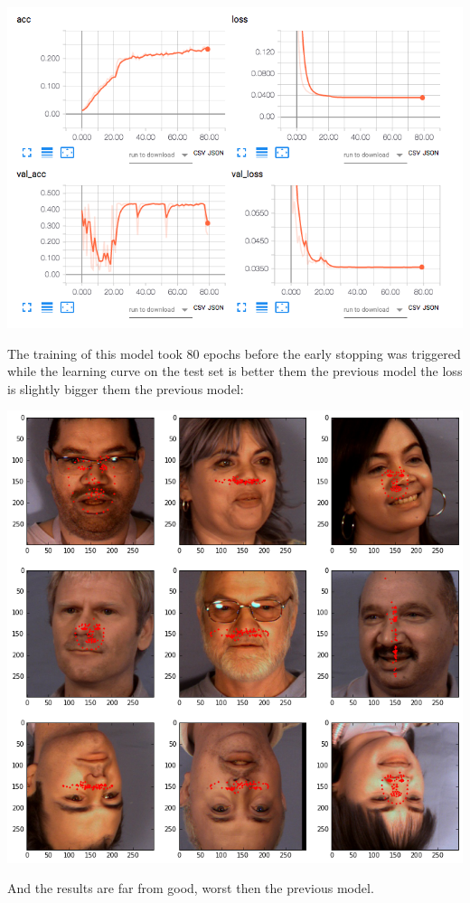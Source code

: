 \documentclass[11pt]{article}
\begin{document}
\begin{enumerate}
\begin{center}
\includegraphics[width=.9\linewidth]{./images/btnLoss.png}
\end{center} 

The training of this model took 80 epochs before the early stopping was
triggered while the learning curve on the test set is better them the previous
model the loss is slightly bigger them the previous model:

\begin{center}
\includegraphics[width=.9\linewidth]{./images/btnResult.png}
\end{center}

And the results are far from good, worst then the previous model. 


\end{enumerate}
\end{document}

